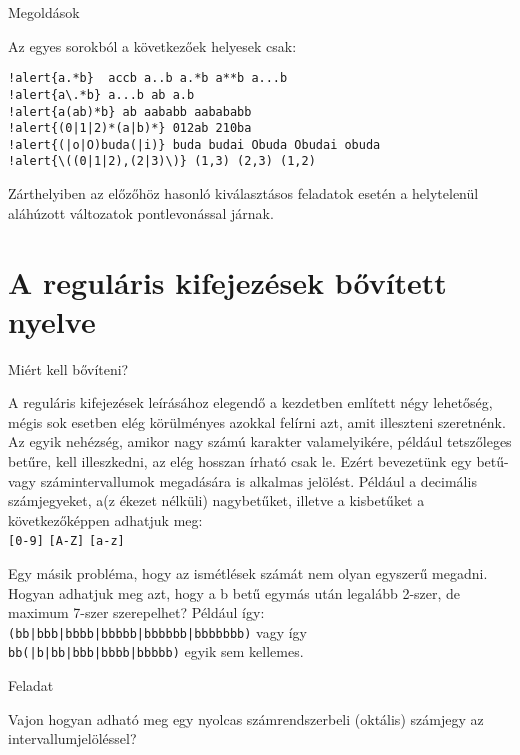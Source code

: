 \documentclass[
    ignorenonframetext
    ]{beamer}
\begin{document}
\begin{frame}[fragile]
    {Megoldások}

    Az egyes sorokból a következőek helyesek csak:

\begin{Verbatim}[commandchars=!\{\}]
!alert{a.*b}  accb a..b a.*b a**b a...b
!alert{a\.*b} a...b ab a.b
!alert{a(ab)*b} ab aababb aabababb
!alert{(0|1|2)*(a|b)*} 012ab 210ba
!alert{(|o|O)buda(|i)} buda budai Obuda Obudai obuda
!alert{\((0|1|2),(2|3)\)} (1,3) (2,3) (1,2)
\end{Verbatim}

    Zárthelyiben az előzőhöz hasonló kiválasztásos feladatok esetén a
    helytelenül aláhúzott változatok pontlevonással járnak.
\end{frame}

\section{A reguláris kifejezések bővített nyelve}

\utolsooldal


\begin{frame}[fragile]
    {Miért kell bővíteni?}

    A reguláris kifejezések leírásához elegendő a kezdetben említett
    négy lehetőség, mégis sok esetben elég körülményes azokkal felírni
    azt, amit illeszteni szeretnénk. Az egyik nehézség, amikor \alert{nagy
    számú karakter valamelyikére}, például tetszőleges betűre, kell
    illeszkedni, az elég hosszan írható csak le.  Ezért bevezetünk egy
    betű- vagy számintervallumok megadására is alkalmas jelölést.
    Például a decimális számjegyeket, a(z ékezet nélküli) nagybetűket,
    illetve a kisbetűket a következőképpen adhatjuk meg:\\
    \verb"[0-9]" \quad
    \verb"[A-Z]" \quad
    \verb"[a-z]"

    \vfill
    Egy másik probléma, hogy az \alert{ismétlések számát} nem olyan
    egyszerű megadni. Hogyan adhatjuk meg azt, hogy a b betű egymás
    után legalább 2-szer, de maximum 7-szer szerepelhet? Például így:\\
    \verb"(bb|bbb|bbbb|bbbbb|bbbbbb|bbbbbbb)" \quad vagy így\\
    \verb"bb(|b|bb|bbb|bbbb|bbbbb)" \quad egyik sem kellemes.
\end{frame}

\begin{frame}[fragile]
    {Feladat}

    Vajon hogyan adható meg egy nyolcas számrendszerbeli (oktális)
    számjegy az intervallumjelöléssel?




\end{frame}
\end{document}
